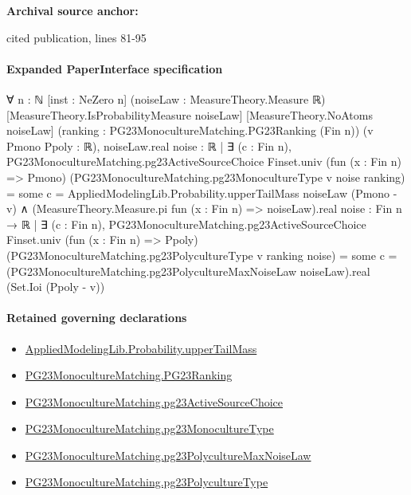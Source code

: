 \documentclass[10pt]{article}
\begin{document}
\textbf{Archival source anchor:} {\footnotesize\raggedright cited publication, lines 81-\allowbreak{}95\par}
\paragraph{Expanded PaperInterface specification}
\begin{ReviewVerbatim}
∀ {n : ℕ} [inst : NeZero n] (noiseLaw : MeasureTheory.Measure ℝ) [MeasureTheory.IsProbabilityMeasure noiseLaw]
  [MeasureTheory.NoAtoms noiseLaw] (ranking : PG23MonocultureMatching.PG23Ranking (Fin n)) (v Pmono Ppoly : ℝ),
  noiseLaw.real
        {noise : ℝ |
          ∃ (c : Fin n),
            PG23MonocultureMatching.pg23ActiveSourceChoice Finset.univ (fun (x : Fin n) => Pmono)
                (PG23MonocultureMatching.pg23MonocultureType v noise ranking) =
              some c} =
      AppliedModelingLib.Probability.upperTailMass noiseLaw (Pmono - v) ∧
    (MeasureTheory.Measure.pi fun (x : Fin n) => noiseLaw).real
        {noise : Fin n → ℝ |
          ∃ (c : Fin n),
            PG23MonocultureMatching.pg23ActiveSourceChoice Finset.univ (fun (x : Fin n) => Ppoly)
                (PG23MonocultureMatching.pg23PolycultureType v ranking noise) =
              some c} =
      (PG23MonocultureMatching.pg23PolycultureMaxNoiseLaw noiseLaw).real (Set.Ioi (Ppoly - v))
\end{ReviewVerbatim}

\paragraph{Retained governing declarations}
\begin{itemize}\raggedright
\item \hyperlink{governing-declaration-f983ca9c59dc317f}{Applied\allowbreak{}Modeling\allowbreak{}Lib.\allowbreak{}Probability.\allowbreak{}upper\allowbreak{}Tail\allowbreak{}Mass}
\item \hyperlink{paper-prerequisite-8769258a80216d15}{PG23\allowbreak{}Monoculture\allowbreak{}Matching.\allowbreak{}PG23\allowbreak{}Ranking}
\item \hyperlink{governing-declaration-4682eea13b337715}{PG23\allowbreak{}Monoculture\allowbreak{}Matching.\allowbreak{}pg23\allowbreak{}Active\allowbreak{}Source\allowbreak{}Choice}
\item \hyperlink{paper-prerequisite-b9706024b8c86426}{PG23\allowbreak{}Monoculture\allowbreak{}Matching.\allowbreak{}pg23\allowbreak{}Monoculture\allowbreak{}Type}
\item \hyperlink{governing-declaration-68814817040b75c3}{PG23\allowbreak{}Monoculture\allowbreak{}Matching.\allowbreak{}pg23\allowbreak{}Polyculture\allowbreak{}Max\allowbreak{}Noise\allowbreak{}Law}
\item \hyperlink{paper-prerequisite-1b5614740ce1beb4}{PG23\allowbreak{}Monoculture\allowbreak{}Matching.\allowbreak{}pg23\allowbreak{}Polyculture\allowbreak{}Type}
\end{itemize}
\end{document}
